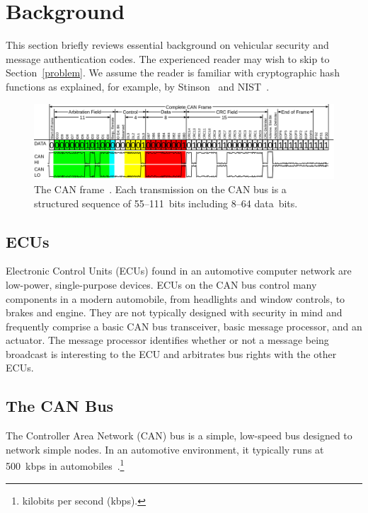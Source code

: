 \section{Background}
\label{background}

This section briefly reviews essential background on vehicular security and message authentication codes. 
The experienced reader may wish to skip to Section~\ref{problem}. 
We assume the reader is familiar with cryptographic hash functions as explained, for example, 
by Stinson~\cite{Stinson} and NIST~\cite{FIPS-180-4}.

	\begin{figure}
		\centering
		\includegraphics[width=\linewidth]{figures/can_frame.png}
		\caption{The CAN frame~\cite{fig1}.  
		Each transmission on the CAN bus is a structured sequence of 55--111~bits including 8--64 data~bits.}
		\label{fig-frame}
	\end{figure}

\subsection{ECUs}
\label{ecu}

Electronic Control Units (ECUs) found in an automotive computer network are low-power, single-purpose devices. ECUs on the CAN bus control many components in a modern automobile, from headlights and window controls, to brakes and engine. They are not typically designed with security in mind and frequently comprise a basic CAN bus transceiver, basic message processor, and an actuator. The message processor identifies whether or not a message being broadcast is interesting to the ECU and arbitrates bus rights with the other ECUs. 


\subsection{The CAN Bus}
\label{can}

The Controller Area Network (CAN) bus 
is a simple, low-speed bus designed to network simple nodes. In an automotive environment, 
it typically runs at 500~kbps in automobiles~\cite{canbus}.\footnote{kilobits per second (kbps).}

